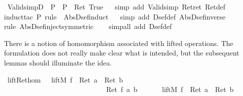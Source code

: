 \begin{isabellebody}
\isamarkupfalse%
\isanewline
\isanewline
\isamarkupfalse%
\ Valid{\isacharunderscore}simpD{\isacharcolon}\ {\isachardoublequote}{\isacharparenleft}{\isasymturnstile}\ P{\isacharparenright}\ {\isacharequal}\ {\isacharparenleft}P\ {\isacharequal}\ Ret\ True{\isacharparenright}{\isachardoublequote}\isanewline
\ \ \isamarkupfalse%
simp\ add{\isacharcolon}\ Valid{\isacharunderscore}simp\ Ret{\isacharunderscore}ret\ Ret{\isacharunderscore}def{\isacharparenright}\isanewline
\ \ \isamarkupfalse%
induct{\isacharunderscore}tac\ P\ rule{\isacharcolon}\ \ Abs{\isacharunderscore}Dsef{\isacharunderscore}induct{\isacharparenright}\isanewline
\ \ \isamarkupfalse%
simp\ add{\isacharcolon}\ Dsef{\isacharunderscore}def\ Abs{\isacharunderscore}Dsef{\isacharunderscore}inverse{\isacharparenright}\isanewline
\ \ \isamarkupfalse%
rule\ Abs{\isacharunderscore}Dsef{\isacharunderscore}inject{\isacharbrackleft}symmetric{\isacharbrackright}{\isacharparenright}\isanewline
\ \ \isamarkupfalse%
\ {\isacharparenleft}simp{\isacharunderscore}all\ add{\isacharcolon}\ Dsef{\isacharunderscore}def{\isacharparenright}\isamarkupfalse%
%
\begin{isamarkuptext}%
There is a notion of homomorphism associated with lifted operations. The formulation
  does not really make clear what is intended, but the subsequent lemmas should
  illuminate the idea.
  \label{isa:lift-ret-hom}%
\end{isamarkuptext}%
\isamarkuptrue%
\ lift{\isacharunderscore}Ret{\isacharunderscore}hom{\isacharcolon}\ \ {\isachardoublequote}{\isacharparenleft}{\isasymUp}\ {\isacharparenleft}liftM{}\ f\ {\isacharparenleft}{\isasymDown}\ {\isacharparenleft}Ret\ a{\isacharparenright}{\isacharparenright}\ {\isacharparenleft}{\isasymDown}\ {\isacharparenleft}Ret\ b{\isacharparenright}{\isacharparenright}{\isacharparenright}{\isacharparenright}\ \isanewline
\ \ \ \ \ \ \ \ \ \ \ \ \ \ \ \ \ \ \ \ \ \ \ \ \ \ \ \ {\isacharequal}\ Ret\ {\isacharparenleft}f\ a\ b{\isacharparenright}{\isachardoublequote}\isanewline
\isamarkupfalse%
\ {\isacharminus}\isanewline
\ \ \isamarkupfalse%
\ {\isachardoublequote}{\isasymUp}\ {\isacharparenleft}liftM{}\ f\ {\isacharparenleft}{\isasymDown}\ {\isacharparenleft}Ret\ a{\isacharparenright}{\isacharparenright}\ {\isacharparenleft}{\isasymDown}\ {\isacharparenleft}Ret\ b{\isacharparenright}{\isacharparenright}{\isacharparenright}\isanewline

\end{isabellebody}
